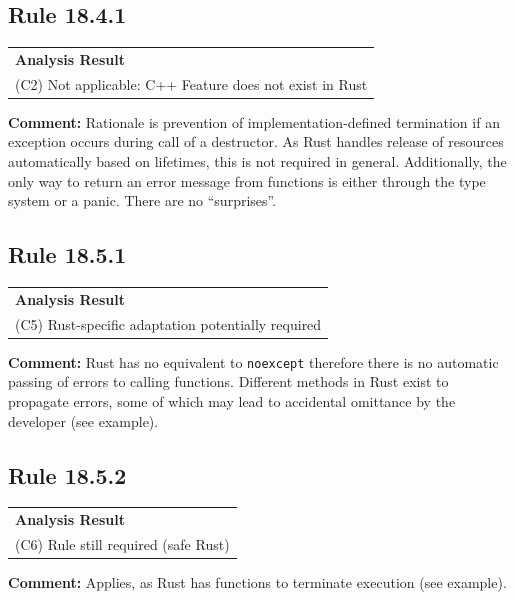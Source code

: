 \subsection*{Rule 18.4.1}
\begin{longtable}{p{13cm}}
\textbf{Analysis Result} \\
(C2) Not applicable: C++ Feature does not exist in Rust \\
\end{longtable}
\textbf{Comment:} Rationale is prevention of implementation-defined termination if an exception occurs during call of a destructor. As Rust handles release of resources automatically based on lifetimes, this is not required in general. Additionally, the only way to return an error message from functions is either through the type system or a panic. There are no ``surprises''. \\
\subsection*{Rule 18.5.1}
\begin{longtable}{p{13cm}}
\textbf{Analysis Result} \\
(C5) Rust-specific adaptation potentially required \\
\end{longtable}
\textbf{Comment:} Rust has no equivalent to \texttt{noexcept} therefore there is no automatic passing of errors to calling functions. Different methods in Rust exist to propagate errors, some of which may lead to accidental omittance by the developer (see example). \\


\subsection*{Rule 18.5.2}
\begin{longtable}{p{13cm}}
\textbf{Analysis Result} \\
(C6) Rule still required (safe Rust) \\
\end{longtable}
\textbf{Comment:} Applies, as Rust has functions to terminate execution (see example). \\


